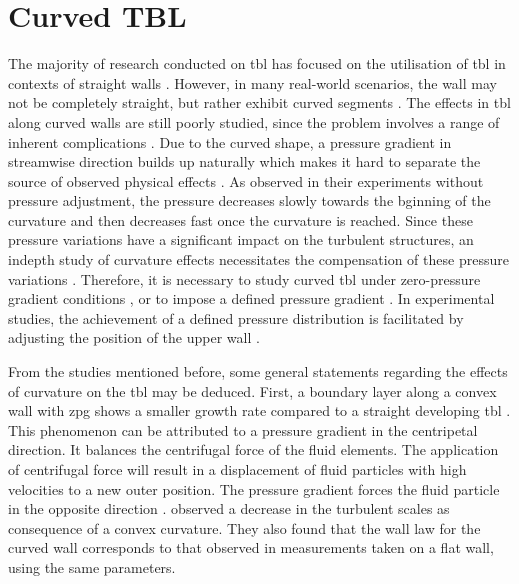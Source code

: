 \section{Curved TBL}

The majority of research conducted on \acrshort{tbl} has focused on the utilisation of \acrshort{tbl}  in contexts of straight walls \citep{pargal_adverse-pressure-gradient_2022}. 
However, in many real-world scenarios, the wall may not be completely straight, but rather exhibit curved segments \citep{spalart_direct_2024}. 
The effects in \acrshort{tbl} along curved walls are still poorly studied, since the problem involves a range of inherent complications \citep{appelbaum_systematic_2025}. 
Due to the curved shape, a pressure gradient in streamwise direction builds up naturally which makes it hard to separate the source of observed physical effects \citep{so_experimental_nodate}. 
As \citet{so_experiment_1973} observed in their experiments without pressure adjustment, the pressure decreases slowly towards the bginning of the curvature and then decreases fast once the curvature is reached. 
Since these pressure variations have a significant impact on the turbulent structures, an indepth study of curvature effects necessitates the  compensation of these pressure variations \citep{appelbaum_systematic_2025}. 
Therefore, it is necessary to study curved \acrshort{tbl} under zero-pressure gradient conditions \citep{so_experimental_nodate,gillis_turbulent_1983}, or to impose a defined pressure gradient \citep{schwarz_convex_1996,pargal_adverse-pressure-gradient_2022,spalart_direct_2024}. 
In experimental studies, the achievement of a defined pressure distribution is facilitated by adjusting the position of the upper wall \citep{so_experimental_nodate, johnston_experimental_nodate, gillis_turbulent_1983,schwarz_convex_1996}. 

From the  studies mentioned before, some general statements regarding the effects of curvature on the \acrshort{tbl} may be  deduced.
First, a boundary layer along a convex wall with  \acrshort{zpg} shows a smaller growth rate compared to a straight developing \acrfull{tbl} \citep{so_experimental_nodate, meroney_turbulent_1975}. 
This phenomenon can be attributed to a pressure gradient in the centripetal direction. 
It balances the centrifugal force of the fluid elements. 
The application of  centrifugal force  will result in a displacement of fluid particles with high velocities to a new outer position. 
The pressure gradient forces the fluid particle in the opposite direction \citep{so_experimental_nodate, meroney_turbulent_1975}.
\citet{gillis_turbulent_1983} observed a decrease in the turbulent scales as consequence of a convex curvature. 
They also found that the wall law for the curved wall corresponds to that observed in measurements taken on a flat wall, using the same parameters. 


